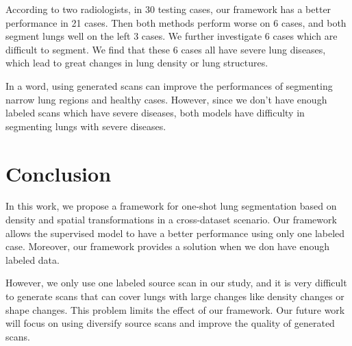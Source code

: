 \documentclass{article}
\begin{document}
According to two radiologists, in 30 testing cases, our framework has a better performance in 21 cases. Then both methods perform worse on 6 cases, and both segment lungs well on the left 3 cases.
We further investigate 6 cases which are difficult to segment. We find that these 6 cases all have severe lung diseases, which lead to great changes in lung density or lung structures. 

In a word, using generated scans can improve the performances of segmenting narrow lung regions and healthy cases. However, since we don't have enough labeled scans which have severe diseases, both models have difficulty in segmenting lungs with severe diseases.

\section{Conclusion}
\label{sec:discussconclusion}
In this work, we propose a framework for one-shot lung segmentation based on density and spatial transformations in a cross-dataset scenario. Our framework allows the supervised model to have a better performance using only one labeled case. Moreover, our framework provides a solution when we don have enough labeled data.

However, we only use one labeled source scan in our study, and it is very difficult to generate scans that can cover lungs with large changes like density changes or shape changes. This problem limits the effect of our framework. Our future work will focus on using diversify source scans and improve the quality of generated scans.



\end{document}
